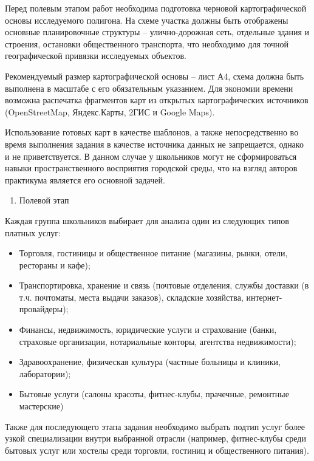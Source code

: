 \documentclass[
  11pt,
  russian,
]{book}
\providecommand{\tightlist}{%
  \setlength{\itemsep}{0pt}\setlength{\parskip}{0pt}}
\begin{document}
Перед полевым этапом работ необходима подготовка черновой картографической основы
исследуемого полигона. На схеме участка должны быть отображены основные
планировочные структуры -- улично-дорожная сеть, отдельные здания и строения,
остановки общественного транспорта, что необходимо для точной географической
привязки исследуемых объектов.

Рекомендуемый размер картографической основы -- лист А4, схема должна быть выполнена в
масштабе с его обязательным указанием. Для экономии времени возможна распечатка
фрагментов карт из открытых картографических источников (OpenStreetMap,
Яндекс.Карты, 2ГИС и Google Maps).

Использование готовых карт в качестве шаблонов, а также непосредственно во время выполнения
задания в качестве источника данных не запрещается, однако и не приветствуется.
В данном случае у школьников могут не сформироваться навыки пространственного
восприятия городской среды, что на взгляд авторов практикума является его
основной задачей.

\begin{enumerate}
\def\labelenumi{\arabic{enumi}.}
\setcounter{enumi}{1}
\tightlist
\item
  Полевой этап
\end{enumerate}

Каждая группа школьников выбирает для анализа один из следующих типов платных услуг:

\begin{itemize}
\item
  Торговля,
  гостиницы и общественное питание (магазины, рынки, отели, рестораны и кафе);
\item
  Транспортировка, хранение и связь
  (почтовые отделения, службы доставки (в т.ч. почтоматы, места выдачи заказов),
  складские хозяйства, интернет-провайдеры);
\item
  Финансы, недвижимость, юридические услуги и страхование (банки, страховые организации,
  нотариальные конторы, агентства недвижимости);
\item
  Здравоохранение, физическая культура (частные больницы и клиники, лаборатории);
\item
  Бытовые услуги (салоны красоты, фитнес-клубы, прачечные, ремонтные мастерские)
\end{itemize}

Также для последующего этапа задания необходимо выбрать подтип услуг более узкой специализации внутри выбранной
отрасли (например, фитнес-клубы среди бытовых услуг или хостелы среди торговли, гостиниц и общественного питания).
\end{document}
